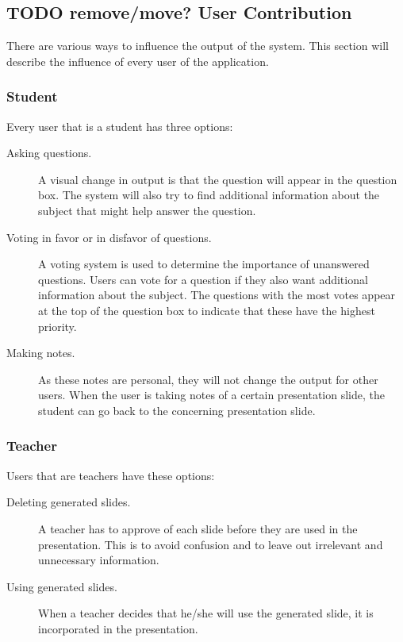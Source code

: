 \documentclass[11pt]{article}
\begin{document}
\subsection{TODO remove/move? User Contribution}
There are various ways to influence the output of the system. This section will describe the influence of every user of the application.
\subsubsection{Student}
Every user that is a student has three options:
\begin{description}
\item[Asking questions.] A visual change in output is that the question will appear in the question box. The system will also try to find additional information about the subject that might help answer the question.
\item[Voting in favor or in disfavor of questions.] A voting system is used to determine the importance of unanswered questions. Users can vote for a question if they also want additional information about the subject. The questions with the most votes appear at the top of the question box to indicate that these have the highest priority.
\item[Making notes.] As these notes are personal, they will not change the output for other users. When the user is taking notes of a certain presentation slide, the student can go back to the concerning presentation slide.
\end{description}
\subsubsection{Teacher}
Users that are teachers have these options: 
\begin{description}
\item[Deleting generated slides.] A teacher has to approve of each slide before they are used in the presentation. This is to avoid confusion and to leave out irrelevant and unnecessary information.
\item[Using generated slides.] When a teacher decides that he/she will use the generated slide, it is incorporated in the presentation. 
\end{description}
\end{document}
